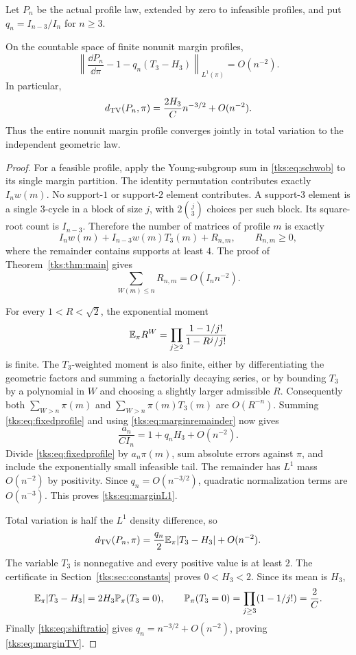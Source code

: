 Let $P_n$ be the actual profile law, extended by zero to infeasible profiles, and put $q_n=I_{n-3}/I_n$ for $n\geq3$.
\begin{theorem}\label{tks:thm:marginlaw}
On the countable space of finite nonunit margin profiles,
\begin{equation}\label{tks:eq:marginL1}
\left\|\frac{\dd P_n}{\dd\pi}-1-q_n(T_3-H_3)\right\|_{L^1(\pi)}
 =O(n^{-2}).
\end{equation}
In particular,
\begin{equation}\label{tks:eq:marginTV}
d_{\mathrm{TV}}(P_n,\pi)=\frac{2H_3}{C}n^{-3/2}+O(n^{-2}).
\end{equation}
Thus the entire nonunit margin profile converges jointly in total variation to the independent geometric law.
\end{theorem}
\begin{proof}
For a feasible profile, apply the Young-subgroup sum in \eqref{tks:eq:schwob} to its single margin partition. The identity permutation contributes exactly $I_nw(m)$. No support-$1$ or support-$2$ element contributes. A support-$3$ element is a single $3$-cycle in a block of size $j$, with $2\binom j3$ choices per such block. Its square-root count is $I_{n-3}$. Therefore the number of matrices of profile $m$ is exactly
\begin{equation}\label{tks:eq:fixedprofile}
I_nw(m)+I_{n-3}w(m)T_3(m)+R_{n,m},\qquad R_{n,m}\geq0,
\end{equation}
where the remainder contains supports at least $4$. The proof of Theorem~\ref{tks:thm:main} gives
\begin{equation}\label{tks:eq:marginremainder}
\sum_{W(m)\leq n}R_{n,m}=O(I_n n^{-2}).
\end{equation}

For every $1<R<\sqrt2$, the exponential moment
\[
\mathbb E_\pi R^W
 =\prod_{j\geq2}\frac{1-1/j!}{1-R^j/j!}
\]
is finite. The $T_3$-weighted moment is also finite, either by differentiating the geometric factors and summing a factorially decaying series, or by bounding $T_3$ by a polynomial in $W$ and choosing a slightly larger admissible $R$. Consequently both
$\sum_{W>n}\pi(m)$ and $\sum_{W>n}\pi(m)T_3(m)$ are $O(R^{-n})$.
Summing \eqref{tks:eq:fixedprofile} and using \eqref{tks:eq:marginremainder} now gives
\[
\frac{a_n}{CI_n}=1+q_nH_3+O(n^{-2}).
\]
Divide \eqref{tks:eq:fixedprofile} by $a_n\pi(m)$, sum absolute errors against $\pi$, and include the exponentially small infeasible tail. The remainder has $L^1$ mass $O(n^{-2})$ by positivity. Since $q_n=O(n^{-3/2})$, quadratic normalization terms are $O(n^{-3})$. This proves \eqref{tks:eq:marginL1}.

Total variation is half the $L^1$ density difference, so
\[
d_{\mathrm{TV}}(P_n,\pi)=\frac{q_n}{2}\mathbb E_\pi|T_3-H_3|+O(n^{-2}).
\]
The variable $T_3$ is nonnegative and every positive value is at least $2$. The certificate in Section~\ref{tks:sec:constants} proves $0<H_3<2$. Since its mean is $H_3$,
\[
\mathbb E_\pi|T_3-H_3|=2H_3\mathbb P_\pi(T_3=0),\qquad
\mathbb P_\pi(T_3=0)=\prod_{j\geq3}(1-1/j!)=\frac2C.
\]
Finally \eqref{tks:eq:shiftratio} gives $q_n=n^{-3/2}+O(n^{-2})$, proving \eqref{tks:eq:marginTV}.
\end{proof}

